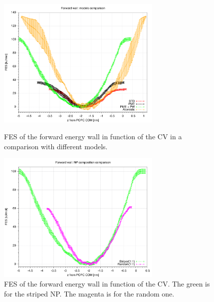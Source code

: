 \begin{figure}[pth]
	\centering
	\includegraphics[width=0.7\textwidth]{./img/results/FESModelComparison/forwardWall}%
	\caption{\acs{FES} of the forward energy wall in function of the \acs{CV} in a comparison with different models.}%
	\label{fig:forwardWall}%
	\vspace*{\floatsep}%
	\includegraphics[width=0.7\textwidth]{./img/results/FESModelComparison/forwardWallRP}%
	\caption{\acs{FES} of the forward energy wall in function of the \acs{CV}. The green is for the striped \acs{NP}. The magenta is for the random one.}%
	\label{fig:forwardWallRP}
\end{figure}

